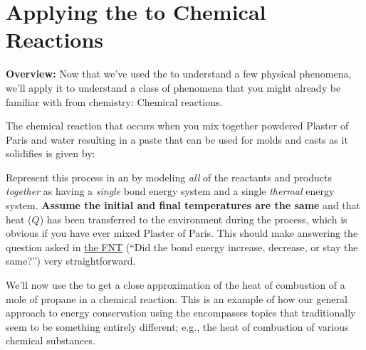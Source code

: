 \section[Energy in Chemical Reactions]{Applying the \EnergyInteractionModel{} to Chemical Reactions}
\label{act1.1.7}

\begin{overview}

\noindent
{\bfseries Overview:} Now that we've used the \EnergyInteractionModel{} to understand a few physical phenomena, we'll apply it to understand a class of phenomena that you might already be familiar with from chemistry: Chemical reactions.

\end{overview}


\begin{fnt}
	
\end{fnt}

\noindent The chemical reaction that occurs when you mix together powdered Plaster of Paris and water resulting in a paste that can be used for molds and casts as it solidifies is given by:			
\begin{center}
\end{center}
Represent this process in an \EnergyDiagram{} by modeling {\em all} of the reactants and products {\em together} as having a {\em single} bond energy system and a single {\em thermal} energy system. \textbf{Assume the initial and final temperatures are the same} and that heat ($Q$) has been transferred to the environment during the process, which is obvious if you have ever mixed Plaster of Paris. This should make answering the question asked in \hyperref[fnt1.1.4-1]{the FNT} (``Did the bond energy increase, decrease, or stay the same?'') very straightforward.


\WCD 

\begin{fnt}
	
\end{fnt}

\noindent
We'll now use the \EnergyInteractionModel{} to get a close approximation of the heat of combustion of a mole of propane in a chemical reaction. This is an example of how our general approach to energy conservation using the \textbf{\EnergyInteractionModel{}} encompasses topics that traditionally seem to be something entirely different; e.g., the heat of combustion of various chemical substances.

